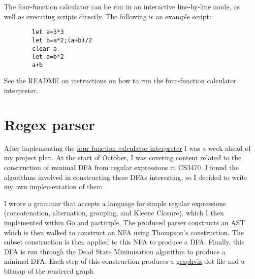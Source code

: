The four-function calculator can be run in an interactive line-by-line mode, as well as executing scripts directly. The following is an example script:

\begin{center}
    \begin{verbatim}
        let a=3*3
        let b=a*2;(a+b)/2
        clear a
        let a=b*2
        a+b
    \end{verbatim}
\end{center}

See the README on instructions on how to run the four-function calculator interpreter.

\section{Regex parser}
\label{sec:regex-parser}

After implementing the \hyperref[sec:four-func-calculator]{four function calculator interpreter} I was a week ahead of my project plan. At the start of October, I was covering content related to the construction of minimal DFA from regular expressions in CS3470. I found the algorithms involved in constructing these DFAs interesting, so I decided to write my own implementation of them.

I wrote a grammar that accepts a language for simple regular expressions (concatenation, alternation, grouping, and Kleene Closure), which I then implemented within Go and participle. The produced parser constructs an AST which is then walked to construct an NFA using Thompson's construction. The subset construction is then applied to this NFA to produce a DFA. Finally, this DFA is run through the Dead State Minimisation algorithm to produce a minimal DFA. Each step of this construction produces a \href{https://graphviz.org/}{graphviz} dot file and a bitmap of the rendered graph.

